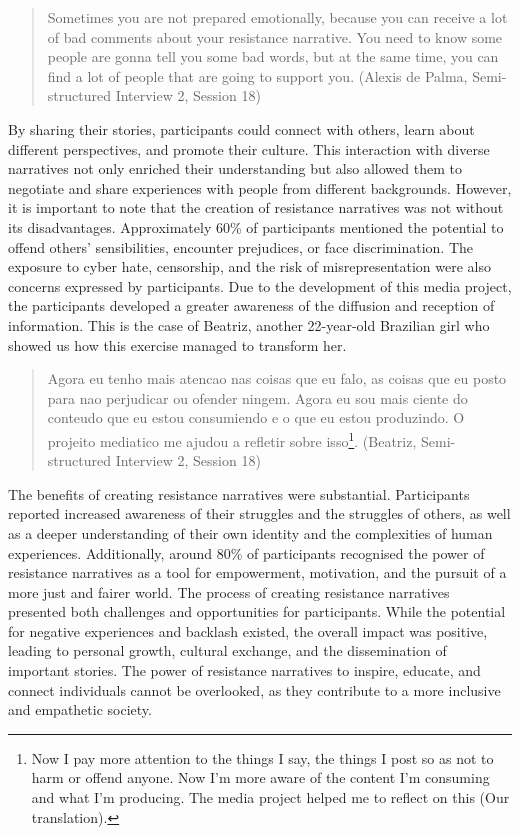 \documentclass[english]{textolivre}
\begin{document}
\begin{quote}
    Sometimes you are not prepared emotionally, because you can receive a lot of bad comments about your resistance narrative. You need to know some people are gonna tell you some bad words, but at the same time, you can find a lot of people that are going to support you. (Alexis de Palma, Semi-structured Interview 2, Session 18)
\end{quote}

By sharing their stories, participants could connect with others, learn about different perspectives, and promote their culture. This interaction with diverse narratives not only enriched their understanding but also allowed them to negotiate and share experiences with people from different backgrounds. However, it is important to note that the creation of resistance narratives was not without its disadvantages. Approximately 60\% of participants mentioned the potential to offend others' sensibilities, encounter prejudices, or face discrimination. The exposure to cyber hate, censorship, and the risk of misrepresentation were also concerns expressed by participants. Due to the development of this media project, the participants developed a greater awareness of the diffusion and reception of information. This is the case of Beatriz, another 22-year-old Brazilian girl who showed us how this exercise managed to transform her.

\begin{quote}
    Agora eu tenho mais atencao nas coisas que eu falo, as coisas que eu posto para nao perjudicar ou ofender ningem. Agora eu sou mais ciente do conteudo que eu estou consumiendo e o que eu estou produzindo. O projeito mediatico me ajudou a refletir sobre isso\footnote{Now I pay more attention to the things I say, the things I post so as not to harm or offend anyone. Now I'm more aware of the content I'm consuming and what I'm producing. The media project helped me to reflect on this (Our translation).}. (Beatriz, Semi-structured Interview 2, Session 18)
\end{quote}

The benefits of creating resistance narratives were substantial. Participants reported increased awareness of their struggles and the struggles of others, as well as a deeper understanding of their own identity and the complexities of human experiences. Additionally, around 80\% of participants recognised the power of resistance narratives as a tool for empowerment, motivation, and the pursuit of a more just and fairer world. The process of creating resistance narratives presented both challenges and opportunities for participants. While the potential for negative experiences and backlash existed, the overall impact was positive, leading to personal growth, cultural exchange, and the dissemination of important stories. The power of resistance narratives to inspire, educate, and connect individuals cannot be overlooked, as they contribute to a more inclusive and empathetic society.
\end{document}
